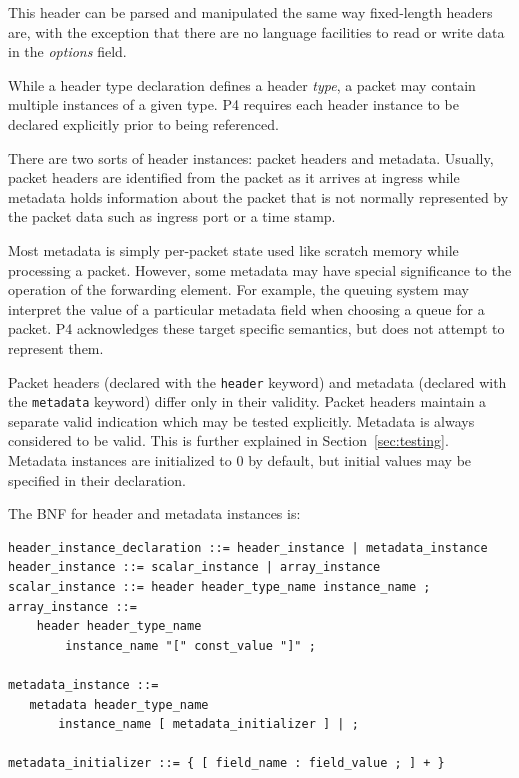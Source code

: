 \documentclass[12pt]{article}
\begin{document}
This header can be parsed and manipulated the same way fixed-length headers
are, with the exception that there are no language facilities to read or
write data in the \textit{options} field.


While a header type declaration defines a header \textit{type}, a packet may contain 
multiple instances of a given type.  P4 requires each header instance to 
be declared explicitly prior to being referenced. 

There are two sorts of header instances: packet headers and metadata. Usually, 
packet headers are identified from the packet as it arrives at ingress while 
metadata holds information about the packet that is not normally represented 
by the packet data such as ingress port or a time stamp.  

Most metadata is simply per-packet state used like scratch memory while
processing a packet. However, some metadata may have special significance to
the operation  of the forwarding element. For example, the queuing system may
interpret the value of a particular metadata field when choosing a queue for a
packet. P4 acknowledges these target specific semantics, but does not attempt
to represent them.

Packet headers (declared with the \texttt{header} keyword) and metadata (declared 
with the \texttt{metadata} keyword) differ only in their validity. Packet headers 
maintain a separate valid indication which may be tested explicitly. Metadata 
is always considered to be valid. This is further explained in 
Section~\ref{sec:testing}.  Metadata instances are 
initialized to 0 by default, but initial values may be specified in their 
declaration.

The BNF for header and metadata instances is:

\begin{lstlisting}[style=BNFstyle]
header_instance_declaration ::= header_instance | metadata_instance
header_instance ::= scalar_instance | array_instance
scalar_instance ::= header header_type_name instance_name ;
array_instance ::=
    header header_type_name 
        instance_name "[" const_value "]" ;

metadata_instance ::= 
   metadata header_type_name
       instance_name [ metadata_initializer ] | ;

metadata_initializer ::= { [ field_name : field_value ; ] + }
\end{lstlisting}
\end{document}
